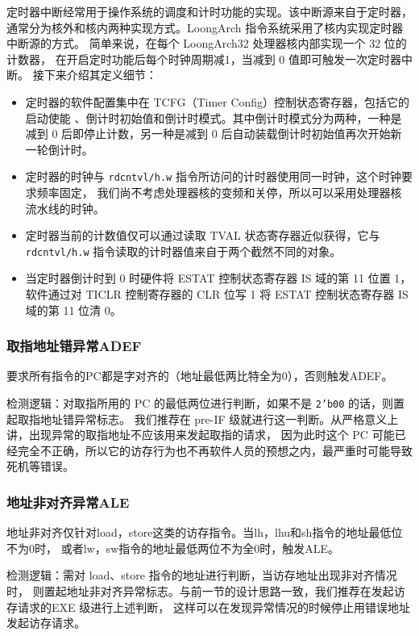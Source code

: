 定时器中断经常用于操作系统的调度和计时功能的实现。该中断源来自于定时器，
通常分为核外和核内两种实现方式。LoongArch 指令系统采用了核内实现定时器中断源的方式。
简单来说，在每个 LoongArch32 处理器核内部实现一个 32 位的计数器，
在开启定时功能后每个时钟周期减1，当减到 0 值即可触发一次定时器中断。
接下来介绍其定义细节：
\begin{itemize}
    \item 定时器的软件配置集中在 TCFG（Timer Config）控制状态寄存器，包括它的启动使能
    、倒计时初始值和倒计时模式。其中倒计时模式分为两种，一种是减到 0 后即停止计数，另一种是减到 0 
    后自动装载倒计时初始值再次开始新一轮倒计时。
    \item 定时器的时钟与 \texttt{rdcntv{l/h}.w} 指令所访问的计时器使用同一时钟，这个时钟要求频率固定，
    我们尚不考虑处理器核的变频和关停，所以可以采用处理器核流水线的时钟。
    \item 定时器当前的计数值仅可以通过读取 TVAL 状态寄存器近似获得，它与 \texttt{rdcntv{l/h}.w} 
    指令读取的计时器值来自于两个截然不同的对象。
    \item 当定时器倒计时到 0 时硬件将 ESTAT 控制状态寄存器
     IS 域的第 11 位置 1，软件通过对 TICLR 控制寄存器的 CLR 位写 1 将 ESTAT 控制状态寄存器 
     IS 域的第 11 位清 0。
\end{itemize}


\subsubsection{取指地址错异常ADEF}

要求所有指令的PC都是字对齐的（地址最低两比特全为0），否则触发ADEF。

检测逻辑：对取指所用的 PC 的最低两位进行判断，如果不是 \texttt{2'b00} 的话，则置起取指地址错异常标志。
我们推荐在 pre-IF 级就进行这一判断。从严格意义上讲，出现异常的取指地址不应该用来发起取指的请求，
因为此时这个 PC 可能已经完全不正确，所以它的访存行为也不再软件人员的预想之内，最严重时可能导致死机等错误。

\subsubsection{地址非对齐异常ALE}

地址非对齐仅针对load，store这类的访存指令。当lh，lhu和sh指令的地址最低位不为0时，
或者lw，sw指令的地址最低两位不为全0时，触发ALE。

检测逻辑：需对 load、store 指令的地址进行判断，当访存地址出现非对齐情况时，
则置起地址非对齐异常标志。与前一节的设计思路一致，我们推荐在发起访存请求的EXE 级进行上述判断，
这样可以在发现异常情况的时候停止用错误地址发起访存请求。

